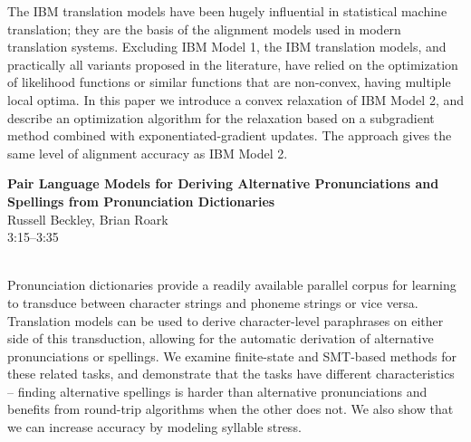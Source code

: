 \documentclass[twoside,makeidx]{book}
\begin{document}
\nopagebreak%
\noindent%
{\small The IBM translation models have been hugely influential in statistical machine translation; they are the basis of the alignment models used in modern translation systems.  Excluding IBM Model 1, the IBM translation models, and practically all variants proposed in the literature, have relied on the optimization of likelihood functions or similar functions that are non-convex, having multiple local optima. In this paper we introduce a convex relaxation of IBM Model 2, and describe an optimization algorithm for the relaxation based on a subgradient method combined with exponentiated-gradient updates. The approach gives the same level of alignment accuracy as IBM Model 2.}
\par\vspace{2em}\noindent%
\begin{minipage}{\linewidth}%
\begin{center}
\textbf{\normalsize Pair Language Models for Deriving Alternative Pronunciations and Spellings from Pronunciation Dictionaries}\\
\normalsize  Russell Beckley,  Brian Roark\\
{\small 3:15--3:35}\\
\end{center}
\end{minipage}\\[0.5em]
\nopagebreak%
\noindent%
{\small Pronunciation dictionaries provide a readily available parallel corpus for   learning to transduce between character strings and phoneme strings   or vice versa.  Translation models can be used to derive   character-level paraphrases on either side of this transduction, allowing for   the automatic derivation of alternative pronunciations or spellings.   We examine finite-state and SMT-based methods for these related   tasks, and demonstrate that the tasks have different characteristics   -- finding alternative spellings is harder than alternative   pronunciations and benefits from round-trip algorithms when the   other does not.  We also show that we can increase accuracy by modeling syllable stress.}
\clearpage
\end{document}
